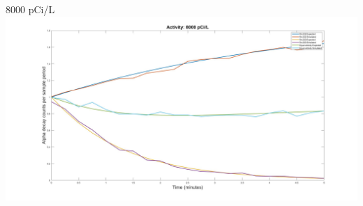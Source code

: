 \documentclass{beamer}
\begin{document}
\begin{frame}{8000 pCi/L}
    \includegraphics[width=\textwidth]{images/8000pCipL.jpg}
\end{frame}




\end{document}
